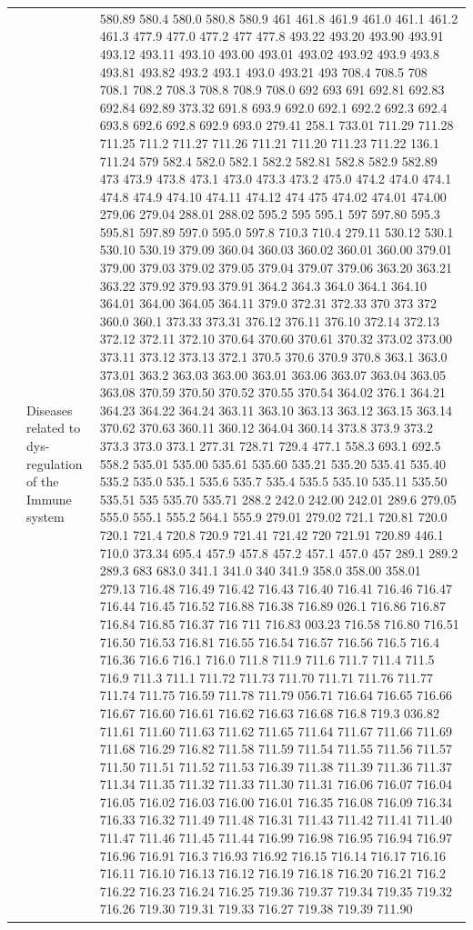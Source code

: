 \documentclass[3p,super,numbers,sort&compress,preprint,10pt]{elsarticle}
\begin{document}
\begin{longtable}{|L{.1in}|L{.6in}||L{5.65in}|}
    & Diseases related to dys-regulation of the Immune system &   580.89 580.4 580.0 580.8 580.9 461 461.8 461.9 461.0 461.1 461.2 461.3 477.9 477.0 477.2 477 477.8 493.22 493.20 493.90 493.91 493.12 493.11 493.10 493.00 493.01 493.02 493.92 493.9 493.8 493.81 493.82 493.2 493.1 493.0 493.21 493 708.4 708.5 708 708.1 708.2 708.3 708.8 708.9 708.0 692 693 691 692.81 692.83 692.84 692.89 373.32 691.8 693.9 692.0 692.1 692.2 692.3 692.4 693.8 692.6 692.8 692.9 693.0 279.41 258.1 733.01 711.29 711.28 711.25 711.2 711.27 711.26 711.21 711.20 711.23 711.22 136.1 711.24 579 582.4 582.0 582.1 582.2 582.81 582.8 582.9 582.89 473 473.9 473.8 473.1 473.0 473.3 473.2 475.0 474.2 474.0 474.1 474.8 474.9 474.10 474.11 474.12 474 475 474.02 474.01 474.00 279.06 279.04 288.01 288.02 595.2 595 595.1 597 597.80 595.3 595.81 597.89 597.0 595.0 597.8 710.3 710.4 279.11 530.12 530.1 530.10 530.19 379.09 360.04 360.03 360.02 360.01 360.00 379.01 379.00 379.03 379.02 379.05 379.04 379.07 379.06 363.20 363.21 363.22 379.92 379.93 379.91 364.2 364.3 364.0 364.1 364.10 364.01 364.00 364.05 364.11 379.0 372.31 372.33 370 373 372 360.0 360.1 373.33 373.31 376.12 376.11 376.10 372.14 372.13 372.12 372.11 372.10 370.64 370.60 370.61 370.32 373.02 373.00 373.11 373.12 373.13 372.1 370.5 370.6 370.9 370.8 363.1 363.0 373.01 363.2 363.03 363.00 363.01 363.06 363.07 363.04 363.05 363.08 370.59 370.50 370.52 370.55 370.54 364.02 376.1 364.21 364.23 364.22 364.24 363.11 363.10 363.13 363.12 363.15 363.14 370.62 370.63 360.11 360.12 364.04 360.14 373.8 373.9 373.2 373.3 373.0 373.1 277.31 728.71 729.4 477.1 558.3 693.1 692.5 558.2 535.01 535.00 535.61 535.60 535.21 535.20 535.41 535.40 535.2 535.0 535.1 535.6 535.7 535.4 535.5 535.10 535.11 535.50 535.51 535 535.70 535.71 288.2 242.0 242.00 242.01 289.6 279.05 555.0 555.1 555.2 564.1 555.9 279.01 279.02 721.1 720.81 720.0 720.1 721.4 720.8 720.9 721.41 721.42 720 721.91 720.89 446.1 710.0 373.34 695.4 457.9 457.8 457.2 457.1 457.0 457 289.1 289.2 289.3 683 683.0 341.1 341.0 340 341.9 358.0 358.00 358.01 279.13 716.48 716.49 716.42 716.43 716.40 716.41 716.46 716.47 716.44 716.45 716.52 716.88 716.38 716.89 026.1 716.86 716.87 716.84 716.85 716.37 716 711 716.83 003.23 716.58 716.80 716.51 716.50 716.53 716.81 716.55 716.54 716.57 716.56 716.5 716.4 716.36 716.6 716.1 716.0 711.8 711.9 711.6 711.7 711.4 711.5 716.9 711.3 711.1 711.72 711.73 711.70 711.71 711.76 711.77 711.74 711.75 716.59 711.78 711.79 056.71 716.64 716.65 716.66 716.67 716.60 716.61 716.62 716.63 716.68 716.8 719.3 036.82 711.61 711.60 711.63 711.62 711.65 711.64 711.67 711.66 711.69 711.68 716.29 716.82 711.58 711.59 711.54 711.55 711.56 711.57 711.50 711.51 711.52 711.53 716.39 711.38 711.39 711.36 711.37 711.34 711.35 711.32 711.33 711.30 711.31 716.06 716.07 716.04 716.05 716.02 716.03 716.00 716.01 716.35 716.08 716.09 716.34 716.33 716.32 711.49 711.48 716.31 711.43 711.42 711.41 711.40 711.47 711.46 711.45 711.44 716.99 716.98 716.95 716.94 716.97 716.96 716.91 716.3 716.93 716.92 716.15 716.14 716.17 716.16 716.11 716.10 716.13 716.12 716.19 716.18 716.20 716.21 716.2 716.22 716.23 716.24 716.25 719.36 719.37 719.34 719.35 719.32 716.26 719.30 719.31 719.33 716.27 719.38 719.39 711.90 
\end{longtable}
\end{document}
